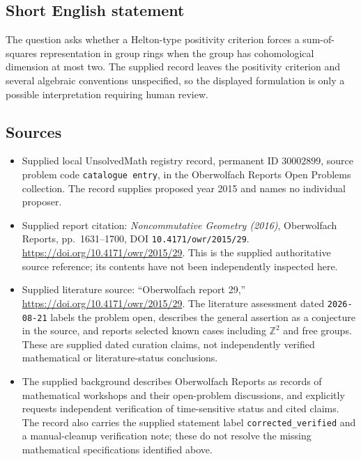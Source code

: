 \documentclass[11pt]{article}
\newcommand{\Z}{\mathbb{Z}}
\begin{document}
\subsection{Short English statement}
The question asks whether a Helton-type positivity criterion forces a sum-of-squares representation in group rings when the group has cohomological dimension at most two. The supplied record leaves the positivity criterion and several algebraic conventions unspecified, so the displayed formulation is only a possible interpretation requiring human review.
\subsection{Sources}
\begin{itemize}
\item Supplied local UnsolvedMath registry record, permanent ID \(30002899\), source problem code \texttt{catalogue entry}, in the Oberwolfach Reports Open Problems collection. The record supplies proposed year 2015 and names no individual proposer.
\item Supplied report citation: \emph{Noncommutative Geometry (2016)}, Oberwolfach Reports, pp.\ 1631--1700, DOI \texttt{10.4171/owr/2015/29}. \url{https://doi.org/10.4171/owr/2015/29}. This is the supplied authoritative source reference; its contents have not been independently inspected here.
\item Supplied literature source: ``Oberwolfach report 29,'' \url{https://doi.org/10.4171/owr/2015/29}. The literature assessment dated \texttt{2026-08-21} labels the problem open, describes the general assertion as a conjecture in the source, and reports selected known cases including \(\Z^2\) and free groups. These are supplied dated curation claims, not independently verified mathematical or literature-status conclusions.
\item The supplied background describes Oberwolfach Reports as records of mathematical workshops and their open-problem discussions, and explicitly requests independent verification of time-sensitive status and cited claims. The record also carries the supplied statement label \texttt{corrected\_verified} and a manual-cleanup verification note; these do not resolve the missing mathematical specifications identified above.
\end{itemize}
\end{document}
